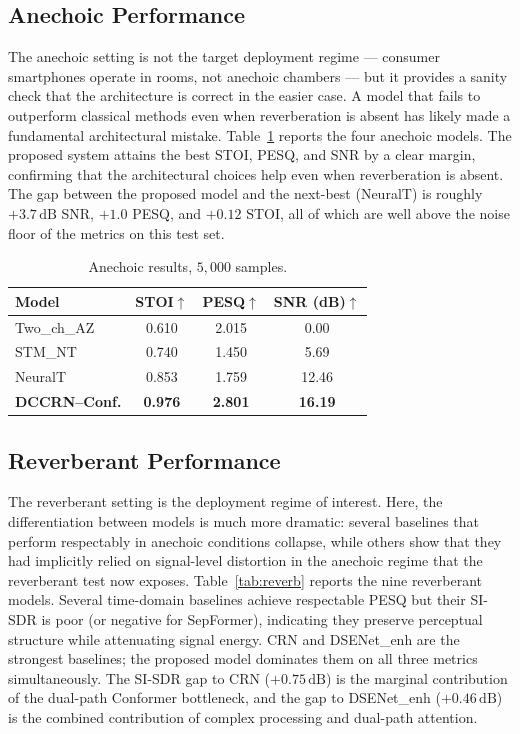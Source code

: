 \documentclass[journal,10pt]{IEEEtran}
\begin{document}
\subsection{Anechoic Performance}
The anechoic setting is not the target deployment regime --- consumer smartphones operate in rooms, not anechoic chambers --- but it provides a sanity check that the architecture is correct in the easier case. A model that fails to outperform classical methods even when reverberation is absent has likely made a fundamental architectural mistake. Table~\ref{tab:anechoic} reports the four anechoic models. The proposed system attains the best STOI, PESQ, and SNR by a clear margin, confirming that the architectural choices help even when reverberation is absent. The gap between the proposed model and the next-best (NeuralT) is roughly \(+3.7\,\mathrm{dB}\) SNR, \(+1.0\) PESQ, and \(+0.12\) STOI, all of which are well above the noise floor of the metrics on this test set.

\begin{table}[!t]
\caption{Anechoic results, \(5{,}000\) samples.}
\label{tab:anechoic}
\centering
\begin{tabular}{l c c c}
\toprule
\textbf{Model} & \textbf{STOI}\(\uparrow\) & \textbf{PESQ}\(\uparrow\) & \textbf{SNR (dB)}\(\uparrow\)\\
\midrule
Two\_ch\_AZ & 0.610 & 2.015 & 0.00\\
STM\_NT & 0.740 & 1.450 & 5.69\\
NeuralT & 0.853 & 1.759 & 12.46\\
\textbf{DCCRN--Conf.} & \textbf{0.976} & \textbf{2.801} & \textbf{16.19}\\
\bottomrule
\end{tabular}
\end{table}

\subsection{Reverberant Performance}
The reverberant setting is the deployment regime of interest. Here, the differentiation between models is much more dramatic: several baselines that perform respectably in anechoic conditions collapse, while others show that they had implicitly relied on signal-level distortion in the anechoic regime that the reverberant test now exposes. Table~\ref{tab:reverb} reports the nine reverberant models. Several time-domain baselines achieve respectable PESQ but their SI-SDR is poor (or negative for SepFormer), indicating they preserve perceptual structure while attenuating signal energy. CRN and DSENet\_enh are the strongest baselines; the proposed model dominates them on all three metrics simultaneously. The SI-SDR gap to CRN (\(+0.75\,\mathrm{dB}\)) is the marginal contribution of the dual-path Conformer bottleneck, and the gap to DSENet\_enh (\(+0.46\,\mathrm{dB}\)) is the combined contribution of complex processing and dual-path attention.
\end{document}
